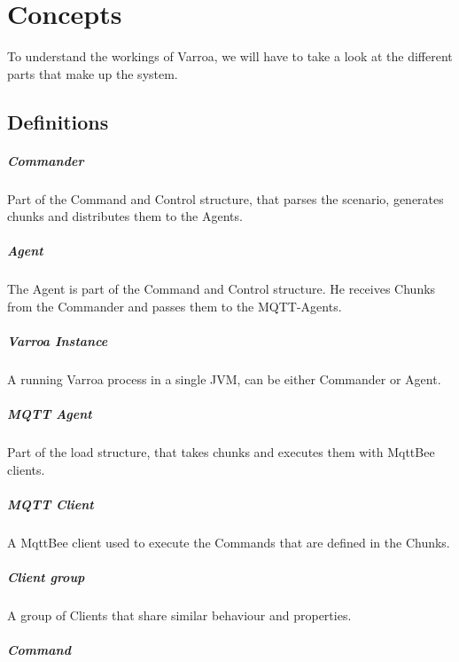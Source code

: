 \chapter{Concepts}
To understand the workings of Varroa, we will have to take a look at the different parts that make up the system.


\section{Definitions}

\paragraph{Commander}
Part of the Command and Control structure, that parses the scenario, generates chunks and distributes them to the Agents.

\paragraph{Agent}
The Agent is part of the Command and Control structure.
He receives Chunks from the Commander and passes them to the MQTT-Agents.

\paragraph{Varroa Instance}
A running Varroa process in a single JVM, can be either Commander or Agent.

\paragraph{MQTT Agent}
Part of the load structure, that takes chunks and executes them with MqttBee clients.

\paragraph{MQTT Client}
A MqttBee client used to execute the Commands that are defined in the Chunks.

\paragraph{Client group}
A group of Clients that share similar behaviour and properties.

\paragraph{Command}

